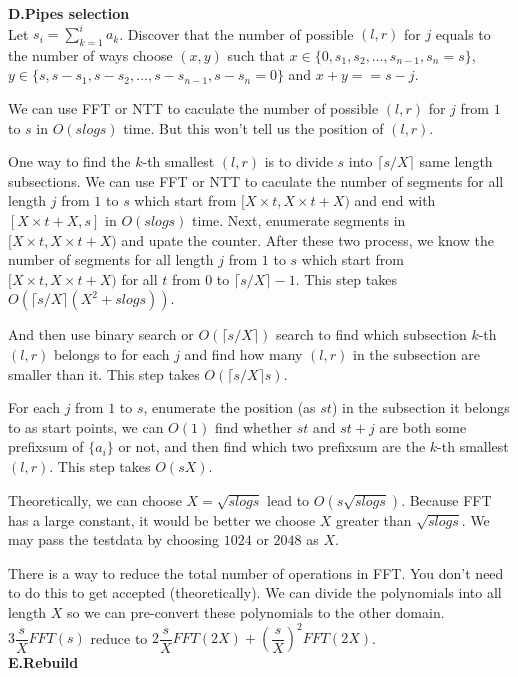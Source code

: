 \documentclass[14pt,a4paper]{article}
\begin{document}
{\Large \bf D.Pipes selection}\\

Let $s_i=\sum\limits_{k=1}^{i}a_k$. 
Discover that the number of possible $(l,r)$ for $j$ equals to the number of ways choose $(x,y)$ 
such that $x\in \{0,s_1,s_2,\ldots,s_{n-1},s_n=s\}$, $y\in \{s,s-s_1,s-s_2,\ldots,s-s_{n-1},s-s_n=0\}$ and $x+y==s-j$.

We can use FFT or NTT to caculate the number of possible $(l,r)$ for $j$ from $1$ to $s$ in $O(slogs)$ time.
But this won't tell us the position of $(l,r)$. 

One way to find the $k$-th smallest $(l,r)$ is to divide $s$ into $\lceil s/X \rceil$ same length subsections. 
We can use FFT or NTT to caculate the number of segments for all length $j$ from $1$ to $s$ which start from $[X\times t,X\times t+X)$ and end with $[X\times t+X,s]$ in $O(slogs)$ time.
Next, enumerate segments in $[X\times t,X\times t+X)$ and upate the counter. 
After these two process, we know the number of segments for all length $j$ from $1$ to $s$ which start from $[X\times t,X\times t+X)$ for all $t$ from $0$ to $\lceil s/X \rceil -1$.
This step takes $O(\lceil s/X \rceil (X^2+slogs))$. 

And then use binary search or $O(\lceil s/X \rceil)$ search to find which subsection $k$-th $(l,r)$ belongs to for each $j$ and find how many $(l,r)$ in the subsection are smaller than it. 
This step takes $O(\lceil s/X \rceil s)$. 

For each $j$ from $1$ to $s$, enumerate the position (as $st$) in the subsection it belongs to as start points, 
we can $O(1)$ find whether $st$ and $st+j$ are both some prefixsum of $\{a_i\}$ or not, and then find which two prefixsum are the $k$-th smallest $(l,r)$. 
This step takes $O(sX)$. 

Theoretically, we can choose $X=\sqrt{slogs}$ lead to $O(s\sqrt{slogs})$. 
Because FFT has a large constant, it would be better we choose $X$ greater than $\sqrt{slogs}$. 
We may pass the testdata by choosing $1024$ or $2048$ as $X$. 

There is a way to reduce the total number of operations in FFT. You don't need to do this to get accepted (theoretically). 
We can divide the polynomials into all length $X$ so we can pre-convert these polynomials to the other domain. 
$3\dfrac{s}{X}FFT(s)$ reduce to $2\dfrac{s}{X}FFT(2X)+(\dfrac{s}{X})^2FFT(2X)$. 
\\

{\Large \bf E.Rebuild}\\
\end{document}
